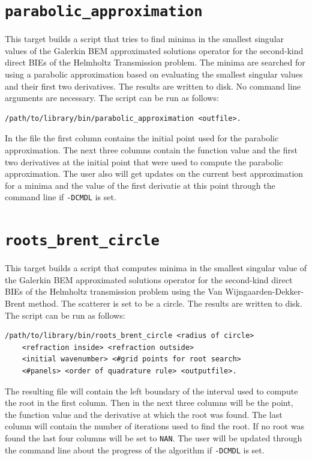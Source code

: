 \documentclass[a4paper, oneside]{thirdparty_stylesheets/discothesis}
\begin{document}
\cprotect\section{\verb|parabolic_approximation|}
This target builds a script that tries to find minima in the smallest singular values
of the Galerkin BEM approximated solutions operator for the second-kind direct BIEs of 
the Helmholtz Transmission problem.
The minima are searched for using a parabolic approximation
based on evaluating the smallest singular values and their first
two derivatives.
The results are written to disk.
No command line arguments are necessary.
The script can be run as follows:
\begin{verbatim}
/path/to/library/bin/parabolic_approximation <outfile>.
\end{verbatim}
In the file the first column contains the initial point used for the parabolic approximation.
The next three columns contain the function value and the first two derivatives at the initial point that were used to compute the parabolic approximation.
The user also will get updates on the current best approximation for a minima and the value of the first derivatie at this point through the command line if \verb|-DCMDL| is set.

\cprotect\section{\verb|roots_brent_circle|}
This target builds a script that computes minima in the smallest singular value of the
Galerkin BEM approximated solutions operator for the second-kind direct BIEs of the Helmholtz
transmission problem using the Van Wijngaarden-Dekker-Brent method.
The scatterer is set to be a circle.
The results are written to disk.
The script can be run as follows:
\begin{verbatim}
/path/to/library/bin/roots_brent_circle <radius of circle> 
	<refraction inside> <refraction outside> 
	<initial wavenumber> <#grid points for root search> 
	<#panels> <order of quadrature rule> <outputfile>.
\end{verbatim}
The resulting file will contain the left boundary of the interval used to compute the root in the first column. 
Then in the next three columns will be the point, the function value and the derivative at which the root was found.
The last column will contain the number of iterations used to find the root.
If no root was found the last four columns will be set to \verb|NAN|.
The user will be updated through the command line about the progress of the algorithm if \verb|-DCMDL| is set.
\end{document}
